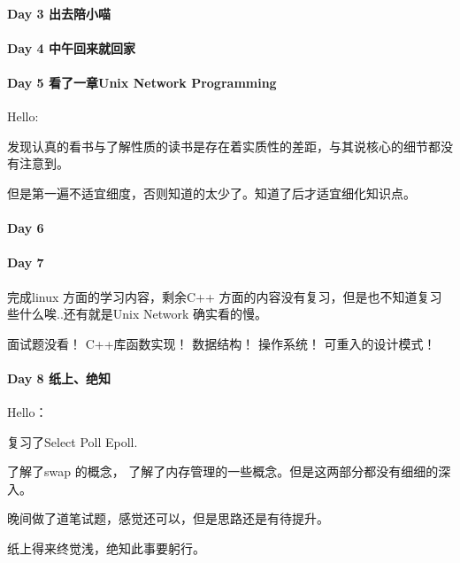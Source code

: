 \documentclass[UTF8,a4paper,8pt]{ctexart}
\begin{document}
 	 \paragraph{Day 3  出去陪小喵     \quad     }
 	 \paragraph{Day 4  中午回来就回家     \quad     }
 	 \paragraph{Day 5  看了一章Unix Network Programming     \quad     }
	 	 Hello:
	 	 
	 	发现认真的看书与了解性质的读书是存在着实质性的差距，与其说核心的细节都没有注意到。
	 	
	 	但是第一遍不适宜细度，否则知道的太少了。知道了后才适宜细化知识点。
 	 \paragraph{Day 6       \quad     }
	 	 
 	 \paragraph{Day 7       \quad     }
	 	 完成linux 方面的学习内容，剩余C++ 方面的内容没有复习，但是也不知道复习些什么唉..还有就是Unix Network 确实看的慢。
	 	 
	 	 面试题没看！  C++库函数实现！ 数据结构！  操作系统！  可重入的设计模式！
 	 \paragraph{Day 8  纸上、绝知  \quad     }
	 	 Hello：
	 	 
	 	 复习了Select Poll Epoll.
	 	 
	 	 了解了swap 的概念， 了解了内存管理的一些概念。但是这两部分都没有细细的深入。
	 	 
	 	 晚间做了道笔试题，感觉还可以，但是思路还是有待提升。
	 	 
	 	 纸上得来终觉浅，绝知此事要躬行。
	 	 
\end{document}
